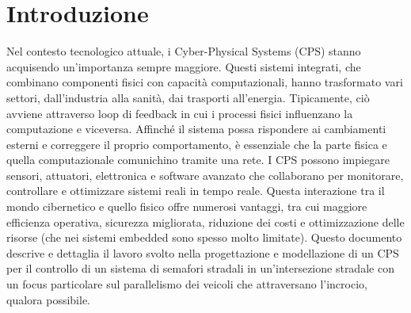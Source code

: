 \chapter*{Introduzione}
\label{cap:introduzione}

\rhead{\thepage}

Nel contesto tecnologico attuale, i Cyber-Physical Systems (CPS) stanno acquisendo un'importanza sempre maggiore. Questi sistemi integrati, che combinano componenti fisici con capacità computazionali, hanno trasformato vari settori, dall'industria alla sanità, dai trasporti all'energia. Tipicamente, ciò avviene attraverso loop di feedback in cui i processi fisici influenzano la computazione e viceversa. Affinché il sistema possa rispondere ai cambiamenti esterni e correggere il proprio comportamento, è essenziale che la parte fisica e quella computazionale comunichino tramite una rete. I CPS possono impiegare sensori, attuatori, elettronica e software avanzato che collaborano per monitorare, controllare e ottimizzare sistemi reali in tempo reale. Questa interazione tra il mondo cibernetico e quello fisico offre numerosi vantaggi, tra cui maggiore efficienza operativa, sicurezza migliorata, riduzione dei costi e ottimizzazione delle risorse (che nei sistemi embedded sono spesso molto limitate). Questo documento descrive e dettaglia il lavoro svolto nella progettazione e modellazione di un CPS per il controllo di un sistema di semafori stradali in un'intersezione stradale con un focus particolare sul parallelismo dei veicoli che attraversano l'incrocio, qualora possibile.